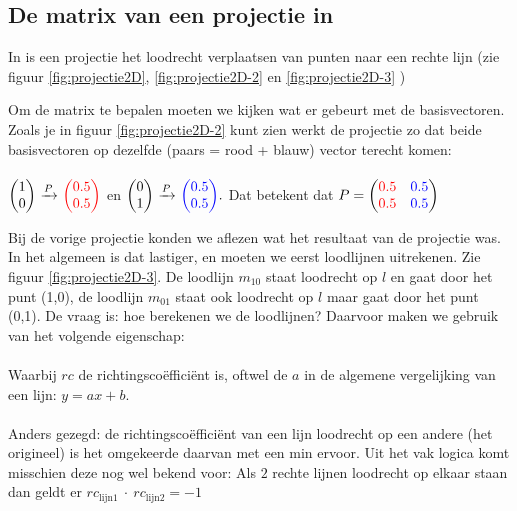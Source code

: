 \subsection{De matrix van een projectie in \RT}
\label{projectie2D}
In \RT is een projectie  het loodrecht verplaatsen van punten   naar een rechte lijn (zie figuur \ref{fig:projectie2D},  \ref{fig:projectie2D-2} en \ref{fig:projectie2D-3} ) \\ 


Om de matrix te bepalen moeten we kijken wat er gebeurt met de basisvectoren. 	
Zoals je in figuur \ref{fig:projectie2D-2} kunt zien werkt de projectie zo dat beide basisvectoren op dezelfde (paars = rood + blauw) vector terecht komen:\\ \\
$ \vectwee{1}{0}  \  \xrightarrow{P}  \   \vectwee[red]{0.5}{0.5} $ \quad en \quad 
$ \vectwee{0}{1}  \  \xrightarrow{P}  \   \vectwee[blue]{0.5}{0.5}. $ 
\quad Dat betekent dat $ P = \begin{pmatrix} {\color{red}0.5}&{\color{blue}0.5} \\ {\color{red}0.5}&{\color{blue}0.5} \end{pmatrix} $

\newpage
{}

Bij de vorige projectie konden we aflezen wat het resultaat van de projectie was. In het algemeen is dat lastiger, en moeten we eerst loodlijnen uitrekenen. Zie figuur  \ref{fig:projectie2D-3}. De loodlijn $ m_{10} $ staat loodrecht op $l$ en gaat door het punt (1,0), de loodlijn $ m_{01} $ staat ook loodrecht op $l$ maar gaat door het punt (0,1). De vraag is: hoe berekenen we de loodlijnen? Daarvoor maken we gebruik van het volgende eigenschap: \\

 \\ Waarbij  $rc$ de richtingscoëfficiënt is, oftwel de $a$ in de algemene vergelijking van een lijn: $ y = ax + b $.\\ \\ Anders gezegd: de richtingscoëfficiënt van een lijn loodrecht op een andere (het origineel) is het omgekeerde daarvan met een min ervoor. Uit het vak logica komt misschien deze nog wel bekend voor: Als $2$ rechte lijnen loodrecht op elkaar staan dan geldt er $ rc_{\text{lijn}1}\ \cdot  \ rc_{\text{lijn}2} = -1 $\\ \\

